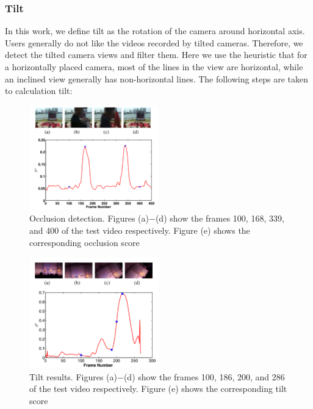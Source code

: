 \documentclass{new}
\begin{document}
\subsubsection{ Tilt}
In this work, we define tilt as the rotation of the camera around
horizontal axis. User\textquotesingle s generally do not like the videos recorded
by tilted cameras. Therefore, we detect the tilted camera views
and filter them. Here we use the heuristic that for a horizontally
placed camera, most of the lines in the view are horizontal, while
an inclined view generally has non-horizontal lines. The following
steps are taken to calculation tilt:
\begin{figure}[h]
\includegraphics[width=0.5\textwidth]{img3}
\caption{Occlusion detection. Figures (a)$-$(d) show the frames
100, 168, 339, and 400 of the test video respectively. Figure (e)
shows the corresponding occlusion score}
\end{figure}

\begin{figure}[h]
\includegraphics[width=0.5\textwidth]{img4}
\caption{ Tilt results. Figures (a)$-$(d) show the frames 100, 186,
200, and 286 of the test video respectively. Figure (e) shows the
corresponding tilt score}
\end{figure}
\end{document}
